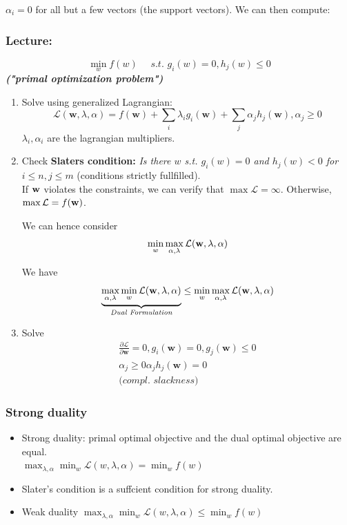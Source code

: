 $\alpha_i = 0$ for all but a few vectors (the support vectors). We can then compute: 
\sepline

\subsubsection{Lecture: } 
$$
	\min_w f(w)\quad \textit{ s.t. } g_i(w) = 0, h_j(w) \leq 0
$$ \textit{\textbf{("primal optimization problem")}}
\begin{enumerate}
	\item Solve using generalized Lagrangian: 
	$$\mathcal L(\mathbf w, \lambda, \alpha) = f(\mathbf w) + \sum_i\lambda_ig_i(\mathbf w) + \sum_{j} \alpha_jh_j(\mathbf w), \alpha_j\geq 0
	$$
	$\lambda_i, \alpha_i$ are the lagrangian multipliers.
	\item Check\textbf{ Slaters condition:} \textit{Is there $w$ s.t. $g_i(w) = 0$ and $h_j(w) < 0$ for $i\leq n, j\leq m$} (conditions strictly fullfilled). \\
	If $\mathbf w$ violates the constraints, we can verify that $\max \mathcal L = \infty$. Otherwise, $\max \mathcal L = f(\mathbf w)$.
	
	We can hence consider 
	$$
		\min_w \max_{\alpha, \lambda} \mathcal L(\mathbf w, \lambda, \alpha)
	$$
	
	We have
	$$
		\underbrace{\max_{\alpha, \lambda} \min_w  \mathcal L(\mathbf w, \lambda, \alpha)}_{\textit{Dual Formulation}}\leq \min_w \max_{\alpha, \lambda} \mathcal L(\mathbf w, \lambda, \alpha)
	$$
	\item Solve
	\begin{equation*}
		\begin{gathered}
			\frac{\partial\mathcal L}{\partial \mathbf w} = 0,
			g_i(\mathbf w) = 0, g_j(\mathbf w) \leq 0 \\
			\alpha_j \geq 0
			\alpha_jh_j(\mathbf w) = 0 \\
			\textit{(compl. slackness)}
		\end{gathered}
	\end{equation*}
\end{enumerate}

\subsubsection{Strong duality}
\begin{itemize}
 	\item Strong duality: primal optimal objective and the dual optimal objective are equal.  \\
	 $\max_{\lambda, \alpha} \min_w \mathcal L(w, \lambda, \alpha) = \min_w f(w)$
	 \item Slater's condition is a suffcient condition for strong duality.

	\item Weak duality
	 $\max_{\lambda, \alpha} \min_w \mathcal L(w, \lambda, \alpha) \leq \min_w f(w)$
\end{itemize}

